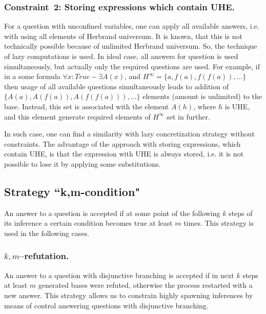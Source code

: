 \documentclass[runningheads,a4paper]{llncs}
\begin{document}
\subsubsection{Constraint~2: Storing expressions which contain UHE.}

For a question with unconfined variables, one can apply all available answers, i.e. with using all elements of Herbrand universum. It is known, that this is not technically possible because of unlimited Herbrand universum. So, the technique of lazy computations is used. In ideal case, all answers for question is used simultaneously, but actually only the required questions are used. For example, if in a some formula $\forall x: True  - \exists A(x)$, and $H^{\infty}= \{a, f(a), f(f(a)), ...\}$ then usage of all available questions simultaneously leads to addition of $\{A(a), A(f(a)), A(f(f(a))), ...\}$ elements (amount is unlimited) to the base. Instead, this set is associated with the element $A(h)$, where $h$ is UHE, and this element generate required elements of $H^{\infty}$ set in further.

In such case, one can find a similarity with lazy concretization strategy without constraints. The advantage of the approach with storing expressions, which contain UHE, is that the expression with UHE is always stored, i.e. it is not possible to lose it by applying some substitutions.


\subsection{Strategy ``k,m-condition"}
An answer to a question is accepted if at some point of the following $k$ steps of its inference a certain condition becomes true at least $m$ times. This strategy is used in the following cases.

\subsubsection{$k,m$--refutation.} An answer to a question with disjunctive branching is accepted if in next $k$ steps at least $m$ generated bases were refuted, otherwise the process restarted with a new answer. This strategy allows us to constrain highly spawning inferences by means of control answering questions with disjunctive branching.
\end{document}
